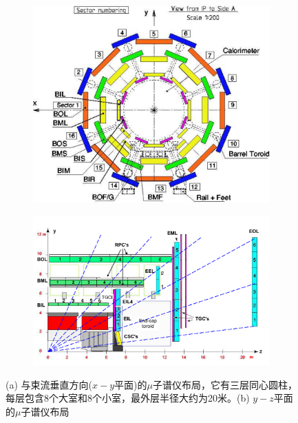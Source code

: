 \begin{figure}[h]
\begin{center}
 \begin{subfigure}[b]{0.45\textwidth}
      \includegraphics[width=\textwidth]{fig/Muon_sector_numbering.pdf}
      \caption{}
      \label{fig:muon_xy}
  \end{subfigure}
 \begin{subfigure}[b]{0.45\textwidth}
      \includegraphics[width=\textwidth]{fig/Muon_rz_large_sect_6.pdf}
      \caption{}
      \label{fig:muon_rz}
  \end{subfigure}
\caption{(a) 与束流垂直方向($x-y$平面)的$\mu$子谱仪布局，它有三层同心圆柱，每层包含8个大室和8个小室，最外层半径大约为20米。(b) $y-z$平面的$\mu$子谱仪布局}
\label{fig:muon_overview}
\end{center}
\end{figure}

